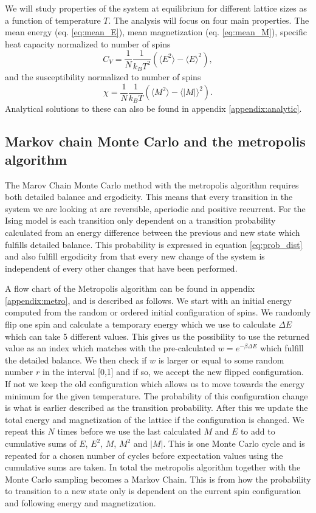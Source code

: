 \documentclass[english,notitlepage,reprint,nofootinbib]{revtex4-1}  %
\begin{document}
We will study properties of the system at equilibrium for different lattice sizes as a function of temperature $T$. The analysis will focus on four main properties. The mean energy (eq. \ref{eq:mean_E}), mean magnetization (eq. \ref{eq:mean_M}), specific heat capacity normalized to number of spins
\begin{equation}
    C_V = \frac{1}{N} \frac{1}{k_B T^2} \left( \langle E^2 \rangle - \langle E \rangle^2 \right),
\end{equation}
and the susceptibility normalized to number of spins
\begin{equation}
    \chi = \frac{1}{N} \frac{1}{k_B T} \left( \langle M^2 \rangle - \langle |M| \rangle^2 \right).
\end{equation}
Analytical solutions to these can also be found in appendix \ref{appendix:analytic}.


\subsection*{Markov chain Monte Carlo and the metropolis algorithm}
The Marov Chain Monte Carlo method with the metropolis algorithm requires both detailed balance and ergodicity. This means that every transition in the system we are looking at are reversible, aperiodic and positive recurrent. For the Ising model is each transition only dependent on a transition probability calculated from an energy difference between the previous and new state which fulfills detailed balance. This probability is expressed in equation \ref{eq:prob_dist} and also fulfill ergodicity from that every new change of the system is independent of every other changes that have been performed.

A flow chart of the Metropolis algorithm can be found in appendix \ref{appendix:metro}, and is described as follows. We start with an initial energy computed from the random or ordered initial configuration of spins. We randomly flip one spin and calculate a temporary energy which we use to calculate $\Delta E$ which can take 5 different values. This gives us the possibility to use the returned value as an index which matches with the pre-calculated $w= e^{-\beta \Delta E}$ which fulfill the detailed balance. We then check if $w$ is larger or equal to some random number $r$ in the interval [0,1] and if so, we accept the new flipped configuration. If not we keep the old configuration which allows us to move towards the energy minimum for the given temperature. The probability of this configuration change is what is earlier described as the transition probability. After this we update the total energy and magnetization of the lattice if the configuration is changed. We repeat this $N$ times before we use the last calculated $M$ and $E$ to add to cumulative sums of $E$, $E^2$, $M$, $M^2$ and $|M|$. This is one Monte Carlo cycle and is repeated for a chosen number of cycles before expectation values using the cumulative sums are taken. In total the metropolis algorithm together with the Monte Carlo sampling becomes a Markov Chain. This is from how the probability to transition to a new state only is dependent on the current spin configuration and following energy and magnetization.
\end{document}

